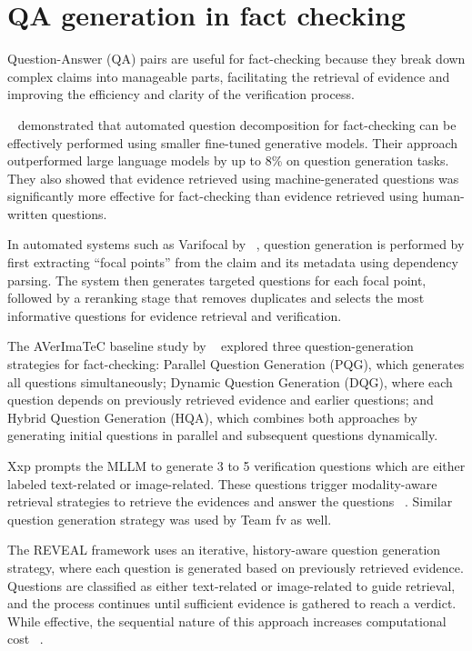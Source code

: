 \section{QA generation in fact checking}

Question-Answer (QA) pairs are useful for fact-checking because they break down complex claims into manageable parts, facilitating the retrieval of evidence and improving the efficiency and clarity of the verification process.

~\citet{Setty2024Jul} demonstrated that automated question decomposition for fact-checking can be effectively performed using smaller fine-tuned generative models. Their approach outperformed large language models by up to 8\% on question generation tasks. They also showed that evidence retrieved using machine-generated questions was significantly more effective for fact-checking than evidence retrieved using human-written questions.

In automated systems such as Varifocal by ~\citet{Ousidhoum2022Dec}, question generation is performed by first extracting “focal points” from the claim and its metadata using dependency parsing. The system then generates targeted questions for each focal point, followed by a reranking stage that removes duplicates and selects the most informative questions for evidence retrieval and verification.

The AVerImaTeC  baseline study by ~\citet{Cao2025May} explored three question-generation strategies for fact-checking: Parallel Question Generation (PQG), which generates all questions simultaneously; Dynamic Question Generation (DQG), where each question depends on previously retrieved evidence and earlier questions; and Hybrid Question Generation (HQA), which combines both approaches by generating initial questions in parallel and subsequent questions dynamically.


Xxp prompts the MLLM to generate 3 to 5 verification questions which are either labeled text-related or image-related. These questions trigger modality-aware retrieval strategies to retrieve the evidences and answer the questions ~\cite{Tsoneva2026Mar}. Similar question generation strategy was used by Team fv as well.

The REVEAL framework uses an iterative, history-aware question generation strategy, where each question is generated based on previously retrieved evidence. Questions are classified as either text-related or image-related to guide retrieval, and the process continues until sufficient evidence is gathered to reach a verdict. While effective, the sequential nature of this approach increases computational cost ~\cite{Tariq2026Mar}.

